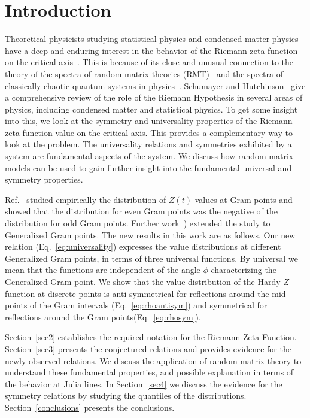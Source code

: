 \documentclass[twoside]{article}
\begin{document}


\section{Introduction}
Theoretical physicists studying statistical physics and condensed matter physics have a 
deep and enduring interest in the behavior of the 
Riemann zeta function on the critical axis~\cite{Shanker 2006}. This is because of
its close and unusual connection  to the theory of the spectra of random matrix theories 
(RMT)~\cite{Wigner 1967, Gaudin 1960, Gaudin 1961, Dyson 1962, Bogomolny 1995, Bogomolny 1996, Katz 1999, Keating 2000a, Keating 2000b, Conrey 2000, 
Hughes 2000, Hughes 2001, Conrey 2002, Conrey 2003} 
and the spectra of classically chaotic quantum systems in 
physics~\cite{Berry 1985,Berry 1986,Berry 1987,Berry 1988}. Schumayer and
Hutchinson~\cite{Schumayer 2011} give a comprehensive review of the role
of the Riemann Hypothesis in several areas of physics, including condensed matter
and statistical physics. To get some insight into this, 
we look at the symmetry and universality properties of the Riemann zeta function value 
on the critical axis. This provides a complementary way to look at the problem.
The universality relations and symmetries exhibited by a system are fundamental aspects 
of the system. We discuss how random matrix models can be used to gain further insight
into the fundamental universal and symmetry properties.

Ref.~\cite{Shanker 2018a} studied empirically the distribution of $Z(t)$ values at 
Gram points and
showed  that the distribution for even Gram points was the negative  of the 
distribution for odd Gram points. 
Further work~\cite{Shanker 2018b}) extended the study to Generalized Gram points. 
The new results in this work are as follows. 
Our new  relation (Eq.~\ref{eq:universality}) expresses the value distributions 
at different Generalized Gram points, in terms of three universal functions.
By universal we mean that the  functions are independent of the angle $\phi$
characterizing the  Generalized Gram point.
We show that the  value
distribution of the Hardy $Z$ function at discrete points is anti-symmetrical 
for reflections around the mid-points 
of the Gram intervals (Eq.~\ref{eq:rhoantisym}) and symmetrical for reflections 
around the Gram points(Eq.~\ref{eq:rhosym}). 

Section~\ref{sec2} establishes the required notation for the 
Riemann Zeta Function. 
Section~\ref{sec3} presents the conjectured relations
and provides evidence for the newly observed relations. We discuss the application
of random matrix theory to understand these fundamental properties, and possible
explanation in terms of the behavior at Julia lines.
In Section~\ref{sec4} we discuss the evidence for the symmetry relations
by studying the quantiles of the distributions.
Section~\ref{conclusions} presents the conclusions. 
\end{document}
